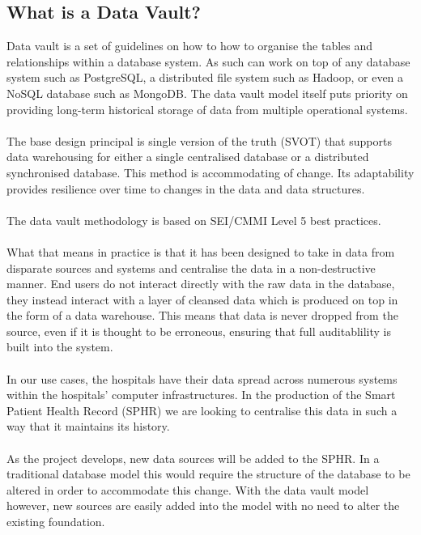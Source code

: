 \subsection{What is a Data Vault?}
\label{sec:datavault}

Data vault is a set of guidelines on how to how to organise the tables and relationships within a database system. As such can work on top of any database system such as PostgreSQL, a distributed file system such as Hadoop, or even a NoSQL database such as MongoDB. The data vault model itself puts priority on providing long-term historical storage of data from multiple operational systems.
\\ \\
\noindent
The base design principal is single version of the truth (SVOT) that supports data warehousing for either a single centralised database or a distributed synchronised database. This method is accommodating of change. Its adaptability provides resilience over time to changes in the data and data structures.
\\ \\
\noindent
The data vault methodology is based on SEI/CMMI Level 5 best practices.
\\ \\
\noindent
What that means in practice is that it has been designed to take in data from disparate sources and systems and centralise the data in a non-destructive manner. End users do not interact directly with the raw data in the database, they instead interact with a layer of cleansed data which is produced on top in the form of a data warehouse. This means that data is never dropped from the source, even if it is thought to be erroneous, ensuring that full auditablility is built into the system.
\\ \\
\noindent
In our use cases, the hospitals have their data spread across numerous systems within the hospitals' computer infrastructures. In the production of the Smart Patient Health Record (SPHR) we are looking to centralise this data in such a way that it maintains its history.
\\ \\
\noindent
As the project develops, new data sources will be added to the SPHR. In a traditional database model this would require the structure of the database to be altered in order to accommodate this change. With the data vault model however, new sources are easily added into the model with no need to alter the existing foundation.

